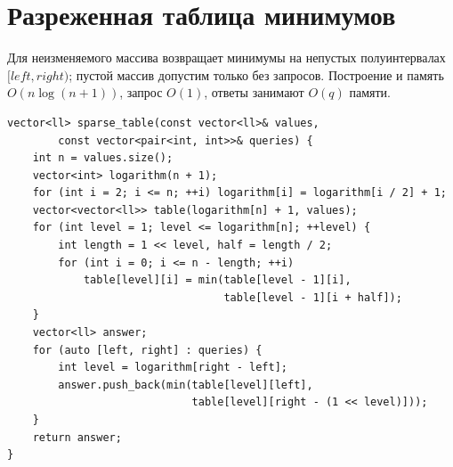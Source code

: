 \section{Разреженная таблица минимумов}
Для неизменяемого массива возвращает минимумы на непустых полуинтервалах $[left,right)$; пустой массив допустим только без запросов.
Построение и память $O(n\log(n+1))$, запрос $O(1)$, ответы занимают $O(q)$ памяти.
\begin{lstlisting}[name=sparse_table]
vector<ll> sparse_table(const vector<ll>& values,
        const vector<pair<int, int>>& queries) {
    int n = values.size();
    vector<int> logarithm(n + 1);
    for (int i = 2; i <= n; ++i) logarithm[i] = logarithm[i / 2] + 1;
    vector<vector<ll>> table(logarithm[n] + 1, values);
    for (int level = 1; level <= logarithm[n]; ++level) {
        int length = 1 << level, half = length / 2;
        for (int i = 0; i <= n - length; ++i)
            table[level][i] = min(table[level - 1][i],
                                  table[level - 1][i + half]);
    }
    vector<ll> answer;
    for (auto [left, right] : queries) {
        int level = logarithm[right - left];
        answer.push_back(min(table[level][left],
                             table[level][right - (1 << level)]));
    }
    return answer;
}
\end{lstlisting}
%

